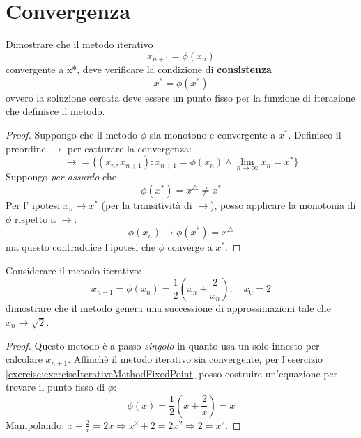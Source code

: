 \section{Convergenza}

\begin{exercise}[1.3] 
\label{exercise:exerciseIterativeMethodFixedPoint}
Dimostrare che il metodo iterativo $$x_{n+1}=\phi(x_{n})$$ convergente a x*,
deve verificare la condizione di \textbf{consistenza} $$x^{*}=\phi(x^{*})$$
ovvero la soluzione cercata deve essere un punto fisso per la funzione di
iterazione che definisce il metodo.
\end{exercise}
\begin{proof}
Suppongo che il metodo $\phi$ sia monotono e convergente a $x^{*}$. Definisco
il preordine $\rightarrow$ per catturare la convergenza:
\begin{displaymath}
\rightarrow = \lbrace (x_{n}, x_{n+1}) : x_{n+1} = \phi(x_{n}) \wedge \lim_{n
\rightarrow \infty}{x_{n}} = x^{*}
\rbrace
\end{displaymath}
Suppongo \emph{per assurdo} che $$\phi(x^{*}) = x^{\triangle} \not = x^{*}$$
Per l' ipotesi $x_{n} \rightarrow x^{*}$ (per la transitivit\`a di
$\rightarrow$), posso applicare la monotonia di $\phi$ rispetto a $\rightarrow$:
$$\phi(x_{n}) \rightarrow \phi(x^{*}) = x^{\triangle}$$ ma questo contraddice 
l'ipotesi che $\phi$ converge a $x^{*}$.
\end{proof}

\begin{exercise}
Considerare il metodo iterativo:
\begin{displaymath}
	x_{n+1} = \phi(x_{n}) = \frac{1}{2} \left ( x_{n} + \frac{2}{x_{n}} \right ), 
		\quad x_{0} = 2
\end{displaymath}
dimostrare che il metodo genera una successione di approssimazioni tale che 
$x_{n} \rightarrow \sqrt{2}$.
\end{exercise}
\begin{proof}
Questo metodo \`e a passo \emph{singolo} in quanto usa un solo innesto per calcolare
$x_{n + 1}$.
Affinch\`e il metodo iterativo sia convergente, per l'esercizio 
\ref{exercise:exerciseIterativeMethodFixedPoint} posso costruire
un'equazione per trovare il punto fisso di $\phi$:
\begin{displaymath}
	\phi(x) =  \frac{1}{2} \left ( x + \frac{2}{x} \right ) = x 
\end{displaymath}
Manipolando: $x + \frac{2}{x} = 2x \Rightarrow x^{2} + 2 = 2x^{2} \Rightarrow 
	2 = x^{2}$.
\end{proof}


